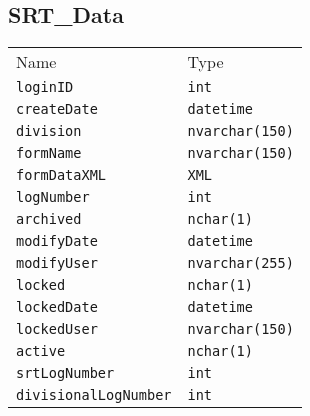 \subsection{SRT\_Data}
\begin{table}[h]
\centering
\begin{tabular}{ll}
Name    & Type  \\
\verb|loginID|      &   \verb|int|          \\
\verb|createDate|   &   \verb|datetime|     \\
\verb|division|     &   \verb|nvarchar(150)|\\
\verb|formName|     &   \verb|nvarchar(150)|\\
\verb|formDataXML|  &   \verb|XML|          \\
\verb|logNumber|    &   \verb|int|          \\
\verb|archived|     &   \verb|nchar(1)|     \\
\verb|modifyDate|   &   \verb|datetime|     \\
\verb|modifyUser|   &   \verb|nvarchar(255)|\\
\verb|locked|       &   \verb|nchar(1)|     \\
\verb|lockedDate|   &   \verb|datetime|     \\
\verb|lockedUser|   &   \verb|nvarchar(150)|\\
\verb|active|       &   \verb|nchar(1)|     \\
\verb|srtLogNumber| &   \verb|int|          \\
\verb|divisionalLogNumber|  &   \verb|int|
\end{tabular}
\end{table}
